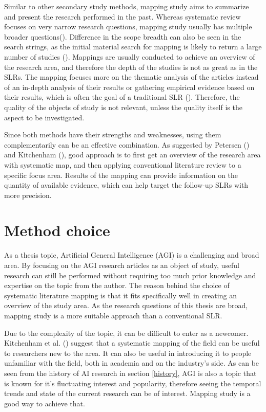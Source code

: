 Similar to other secondary study methods, mapping study aims to summarize and
present the research performed in the past. Whereas systematic review focuses on
very narrow research questions, mapping study usually has multiple broader
questions(\cite{kitchenham2010}). Difference in the scope breadth can also be
seen in the search strings, as the initial material search for mapping is likely
to return a large number of studies (\cite{kitchenham2007, petersen2008}).
Mappings are usually conducted to achieve an overview of the research area, and
therefore the depth of the studies is not as great as in the SLRs. The mapping
focuses more on the thematic analysis of the articles instead of an in-depth
analysis of their results or gathering empirical evidence based on their
results, which is often the goal of a traditional SLR (\cite{petersen2008}).
Therefore, the quality of the objects of study is not relevant, unless the
quality itself is the aspect to be investigated.

Since both methods have their strengths and weaknesses, using them
complementarily can be an effective combination. As suggested by Petersen
(\cite{petersen2008}) and Kitchenham (\cite{kitchenham2010}), good approach is
to first get an overview of the research area with systematic map, and then
applying conventional literature review to a specific focus area. Results of the
mapping can provide information on the quantity of available evidence, which can
help target the follow-up SLRs with more precision.


\section{Method choice}

As a thesis topic, Artificial General Intelligence (AGI) is a challenging and
broad area. By focusing on the AGI research articles as an object of study,
useful research can still be performed without requiring too much prior
knowledge and expertise on the topic from the author. The reason behind the
choice of systematic literature mapping is that it fits specifically well in
creating an overview of the study area. As the research questions of this thesis
are broad, mapping study is a more suitable approach than a conventional SLR.

Due to the complexity of the topic, it can be difficult to enter as a newcomer.
Kitchenham et al. (\cite*{kitchenham2010}) suggest that a systematic mapping of
the field can be useful to researchers new to the area.  It can also be useful
in introducing it to people unfamiliar with the field, both in academia and on
the industry's side. As can be seen from the history of AI research in section
\ref{history}, AGI is also a topic that is known for it's fluctuating interest
and popularity, therefore seeing the temporal trends and state of the current
research can be of interest. Mapping study is a good way to achieve that.

